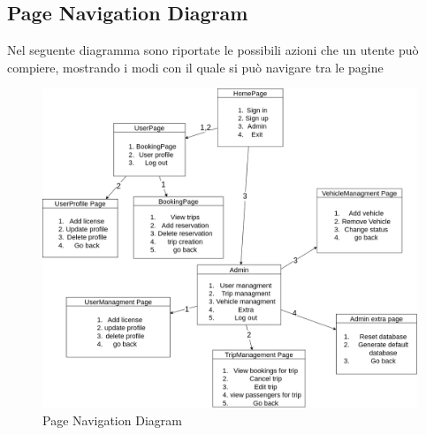 \subsection{Page Navigation Diagram}\label{subsec:PageNavigation}
Nel seguente diagramma sono riportate le possibili azioni che un utente può compiere, mostrando i modi con il quale si può navigare tra le pagine
\begin{figure}[H]
    \centering
    \includegraphics[width = 1.25\linewidth]{Images/PageNavigation_diag.png}
    \caption{Page Navigation Diagram}
    \label{fig:PageNavdiag}
\end{figure}
